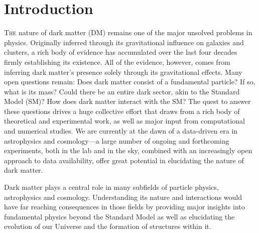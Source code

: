 \chapter{Introduction}
\label{ch:intro}

\lettrine[lines=3]{T}{he} nature of dark matter (DM) remains one of the major unsolved problems in physics. Originally inferred through its gravitational influence on galaxies and clusters, a rich body of evidence has accumulated over the last four decades firmly establishing its existence. All of the evidence, however, comes from inferring dark matter's presence solely through its gravitational effects. Many open questions remain: Does dark matter consist  of a fundamental particle? If so, what is its mass? Could there be an entire dark sector, akin to the Standard Model (SM)? How does dark matter interact with the SM? The quest to answer these questions drives a huge collective effort that draws from a rich body of theoretical and experimental work, as well as major input from computational and numerical studies. We are currently at the dawn of a data-driven era in astrophysics and cosmology---a large number of ongoing and forthcoming experiments, both in the lab and in the sky, combined with an increasingly open approach to data availability, offer great potential in elucidating the nature of dark matter. 

Dark matter plays a central role in many subfields of particle physics, astrophysics and cosmology. Understanding its nature and interactions would have far reaching consequences in those fields by providing major insights into fundamental physics beyond the Standard Model as well as elucidating the evolution of our Universe and the formation of structures within it. 


